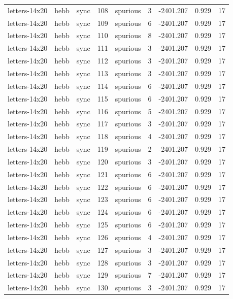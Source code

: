 \begin{tabular}{lllrlrrrr}
letters-14x20 & hebb & sync & 108 & spurious & 3 & -2401.207 & 0.929 & 17 \\
letters-14x20 & hebb & sync & 109 & spurious & 6 & -2401.207 & 0.929 & 17 \\
letters-14x20 & hebb & sync & 110 & spurious & 8 & -2401.207 & 0.929 & 17 \\
letters-14x20 & hebb & sync & 111 & spurious & 3 & -2401.207 & 0.929 & 17 \\
letters-14x20 & hebb & sync & 112 & spurious & 3 & -2401.207 & 0.929 & 17 \\
letters-14x20 & hebb & sync & 113 & spurious & 3 & -2401.207 & 0.929 & 17 \\
letters-14x20 & hebb & sync & 114 & spurious & 6 & -2401.207 & 0.929 & 17 \\
letters-14x20 & hebb & sync & 115 & spurious & 6 & -2401.207 & 0.929 & 17 \\
letters-14x20 & hebb & sync & 116 & spurious & 5 & -2401.207 & 0.929 & 17 \\
letters-14x20 & hebb & sync & 117 & spurious & 3 & -2401.207 & 0.929 & 17 \\
letters-14x20 & hebb & sync & 118 & spurious & 4 & -2401.207 & 0.929 & 17 \\
letters-14x20 & hebb & sync & 119 & spurious & 2 & -2401.207 & 0.929 & 17 \\
letters-14x20 & hebb & sync & 120 & spurious & 3 & -2401.207 & 0.929 & 17 \\
letters-14x20 & hebb & sync & 121 & spurious & 6 & -2401.207 & 0.929 & 17 \\
letters-14x20 & hebb & sync & 122 & spurious & 6 & -2401.207 & 0.929 & 17 \\
letters-14x20 & hebb & sync & 123 & spurious & 6 & -2401.207 & 0.929 & 17 \\
letters-14x20 & hebb & sync & 124 & spurious & 6 & -2401.207 & 0.929 & 17 \\
letters-14x20 & hebb & sync & 125 & spurious & 6 & -2401.207 & 0.929 & 17 \\
letters-14x20 & hebb & sync & 126 & spurious & 4 & -2401.207 & 0.929 & 17 \\
letters-14x20 & hebb & sync & 127 & spurious & 3 & -2401.207 & 0.929 & 17 \\
letters-14x20 & hebb & sync & 128 & spurious & 3 & -2401.207 & 0.929 & 17 \\
letters-14x20 & hebb & sync & 129 & spurious & 7 & -2401.207 & 0.929 & 17 \\
letters-14x20 & hebb & sync & 130 & spurious & 3 & -2401.207 & 0.929 & 17 \\

\end{tabular}
